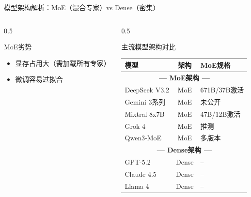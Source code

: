 \documentclass[aspectratio=169,11pt]{beamer}
\begin{document}
\begin{frame}{模型架构解析：MoE（混合专家）vs Dense（密集）}
\begin{columns}
\begin{column}{0.5\textwidth}
            \begin{alertblock}{MoE劣势}
                \scriptsize
                \begin{itemize}
                    \item \textcolor{red}{\faTimes} 显存占用大（需加载所有专家）
                    \item \textcolor{red}{\faTimes} 微调容易过拟合
                \end{itemize}
            \end{alertblock}
        \end{column}
        \begin{column}{0.5\textwidth}
            \begin{block}{主流模型架构对比}
                \centering
                \scriptsize
                \begin{tabular}{l|c|l}
                    \toprule
                    \textbf{模型} & \textbf{架构} & \textbf{MoE规格} \\
                    \midrule
                    \multicolumn{3}{c}{\textbf{--- MoE架构 ---}} \\
                    \rowcolor{blue!10}
                    DeepSeek V3.2 & MoE & 671B/37B激活 \\
                    Gemini 3系列 & MoE & 未公开 \\
                    Mixtral 8x7B & MoE & 47B/12B激活 \\
                    Grok 4 & MoE & 推测 \\
                    Qwen3-MoE & MoE & 多版本 \\
                    \midrule
                    \multicolumn{3}{c}{\textbf{--- Dense架构 ---}} \\
                    GPT-5.2 & Dense & -- \\
                    Claude 4.5 & Dense & -- \\
                    Llama 4 & Dense & -- \\
                    \bottomrule
                \end{tabular}
            \end{block}
            

\end{column}
\end{columns}
\end{frame}
\end{document}
